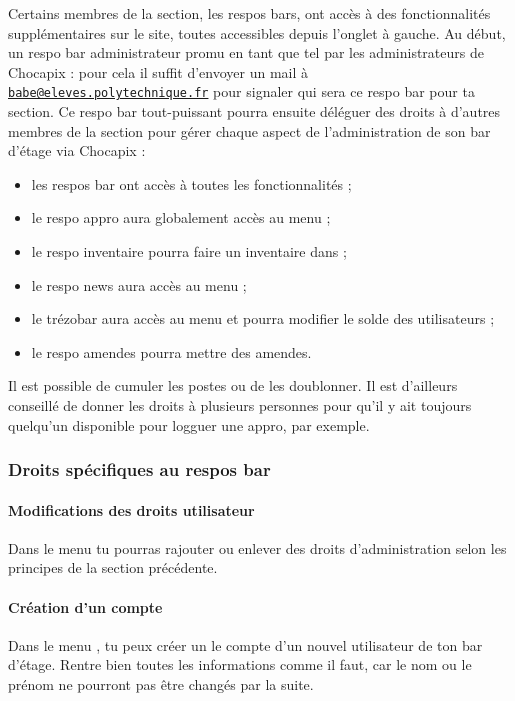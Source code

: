 \documentclass[12pt,french]{article}
\begin{document}
Certains membres de la section, les respos bars, ont accès à des fonctionnalités supplémentaires sur le site, toutes accessibles depuis l'onglet  à gauche. Au début, un respo bar administrateur promu en tant que tel par les administrateurs de Chocapix : pour cela il suffit d'envoyer un mail à \href{mailto:babe@eleves.polytechnique.fr}{\texttt{babe@eleves.polytechnique.fr}} pour signaler qui sera ce respo bar pour ta section. Ce respo bar tout-puissant pourra ensuite déléguer des droits à d'autres membres de la section pour gérer chaque aspect de l'administration de son bar d'étage via Chocapix :
\begin{itemize}
	\item les respos bar ont accès à toutes les fonctionnalités ;
	\item le respo appro aura globalement accès au menu  ;
	\item le respo inventaire pourra faire un inventaire dans  ;
	\item le respo news aura accès au menu  ;
	\item le trézobar aura accès au menu  et pourra modifier le solde des utilisateurs ;
	\item le respo amendes pourra mettre des amendes.
\end{itemize}
Il est possible de cumuler les postes ou de les doublonner. Il est d'ailleurs conseillé de donner les droits à plusieurs personnes pour qu'il y ait toujours quelqu'un disponible pour logguer une appro, par exemple.

\subsubsection{Droits spécifiques au respos bar}

\paragraph{Modifications des droits utilisateur} Dans le menu  tu pourras rajouter ou enlever des droits d'administration selon les principes de la section précédente.

\paragraph{Création d'un compte} Dans le menu , tu peux créer un le compte d'un nouvel utilisateur de ton bar d'étage. Rentre bien toutes les informations comme il faut, car le nom ou le prénom ne pourront pas être changés par la suite.
\end{document}
